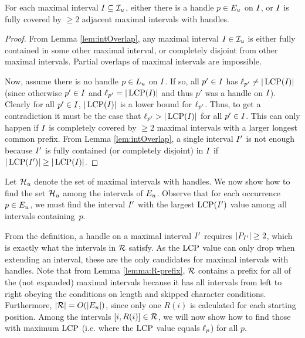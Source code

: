 \begin{lemma}
  \label{lem:handles}
    For each maximal interval $I_{} \subseteq \mathcal{I}_{u}$, either there is a handle $p \in E_{u}$ on $I_{}$, or $I_{}$ is fully covered by $\geq 2$ adjacent maximal intervals with handles.
\end{lemma}
\begin{proof}
    From Lemma \ref{lem:intOverlap}, any maximal interval $I_{} \in \mathcal{I}_{u}$ is either fully contained in some other maximal interval, or completely disjoint from other maximal intervals. Partial overlaps of maximal intervals are impossible.
    
    Now, assume there is no handle $p \in L_{u}$ on $I_{}$. If so, all $p' \in I_{}$ has $\operatorname{\ell}_{p'} \not = |\operatorname{LCP}(I_{})|$ (since otherwise $p' \in I_{}$ and $\operatorname{\ell}_{p'} = |\operatorname{LCP}(I_{})|$ and thus $p'$ was a handle on $I_{}$).
    Clearly for all $p' \in I_{}$, $|\operatorname{LCP}(I_{})|$ is a lower bound for $\operatorname{\ell}_{p'}$. Thus, to get a contradiction it must be the case that $\operatorname{\ell}_{p'} > |\operatorname{LCP}(I_{})|$ for all $p' \in I_{}$.
    This can only happen if $I_{}$ is completely covered by $\geq 2$ maximal intervals with a larger longest common prefix. From Lemma \ref{lem:intOverlap}, a single interval $I_{}'$ is not enough because $I_{}'$ is fully contained (or completely disjoint) in $I_{}$ if $|\operatorname{LCP}(I_{}')| \geq |\operatorname{LCP}(I_{})|$.
\end{proof}

Let $\mathcal{H}_{u}$ denote the set of maximal intervals with handles. We now show how to find the set $\mathcal{H}_{u}$ among the intervals of $E_{u}$. Observe that for each occurrence $p \in E_{u}$, we must find the interval $I_{}'$ with the largest $\operatorname{LCP}(I_{}')$ value among all intervals containing~$p$.

From the definition, a handle on a maximal interval $I_{}'$ requires $|P_{I_{}'}| \geq 2$, which is exactly what the intervals in $\mathcal{R}$ satisfy. As the $\operatorname{LCP}$ value can only drop when extending an interval, these are the only candidates for maximal intervals with handles. Note that from Lemma \ref{lemma:R-prefix}, $\mathcal{R}$ contains a prefix for all of the (not expanded) maximal intervals because it has all intervals from left to right obeying the conditions on length and skipped character conditions. Furthermore, $|\mathcal{R}| = O(|E_{u}|)$, since only one $R(i)$ is calculated for each starting position. Among the intervals $[i, R(i)] \in \mathcal{R}$, we will now show how to find those with maximum $\operatorname{LCP}$ (i.e. where the $\operatorname{LCP}$ value equals $\operatorname{\ell}_{p}$) for all $p$.

